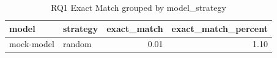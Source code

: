 \begin{table}
\caption{RQ1 Exact Match grouped by model_strategy}
\label{tab:rq1_model_strategy}
\begin{tabular}{llrr}
\toprule
model & strategy & exact_match & exact_match_percent \\
\midrule
mock-model & random & 0.01 & 1.10 \\
\bottomrule
\end{tabular}
\end{table}
